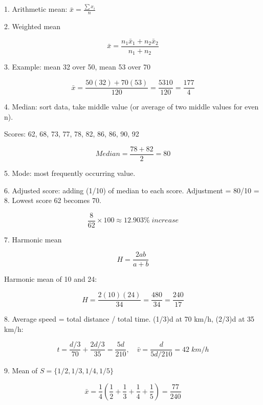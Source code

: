 1. Arithmetic mean: $\bar{x} = \frac{\sum x_i}{n}$

2. Weighted mean

$$ \bar{x} = \frac{n_1 \bar{x}_1 + n_2 \bar{x}_2}{n_1+n_2} $$

3. Example: mean 32 over 50, mean 53 over 70

$$ \bar{x} = \frac{50(32)+70(53)}{120} = \frac{5310}{120} = \frac{177}{4} $$

4. Median: sort data, take middle value (or average of two middle values for even n).

Scores: 62, 68, 73, 77, 78, 82, 86, 86, 90, 92

$$ Median = \frac{78+82}{2} = 80 $$

5. Mode: most frequently occurring value.

6. Adjusted score: adding (1/10) of median to each score. Adjustment = 80/10 = 8. Lowest score 62 becomes 70.

$$ \frac{8}{62} \times 100 \approx 12.903\% \; increase $$

7. Harmonic mean

$$ H = \frac{2ab}{a+b} $$

Harmonic mean of 10 and 24:

$$ H = \frac{2(10)(24)}{34} = \frac{480}{34} = \frac{240}{17} $$

8. Average speed = total distance / total time. (1/3)d at 70 km/h, (2/3)d at 35 km/h:

$$ t = \frac{d/3}{70} + \frac{2d/3}{35} = \frac{5d}{210}, \quad \bar{v} = \frac{d}{5d/210} = 42 \; km/h $$

9. Mean of $S = \{1/2, 1/3, 1/4, 1/5\}$

$$ \bar{x} = \frac{1}{4}\left(\frac{1}{2}+\frac{1}{3}+\frac{1}{4}+\frac{1}{5}\right) = \frac{77}{240} $$
